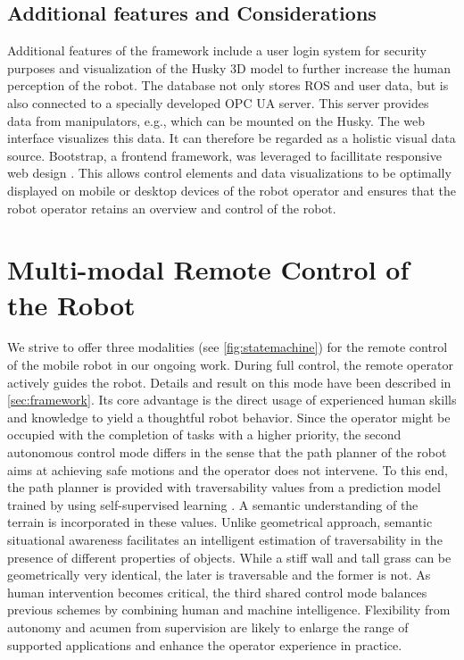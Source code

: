 \documentclass[letterpaper, 10 pt, conference]{ieeeconf}  %
\begin{document}
\subsection{Additional features and Considerations}
Additional features of the framework include a user login system for security purposes and visualization of the Husky 3D model to further increase the human perception of the robot. 
The database not only stores ROS and user data, but is also connected to a specially developed OPC UA server. This server provides data from manipulators, e.g., which can be mounted on the Husky. 
The web interface visualizes this data. It can therefore be regarded as a holistic visual data source.
Bootstrap, a frontend framework, was leveraged to facillitate responsive web design \cite{bootstrap}. 
This allows control elements and data visualizations to be optimally displayed on mobile or desktop devices of the robot operator and ensures that the robot operator retains an overview and control of the robot.




\section{Multi-modal Remote Control of the Robot}
We strive to offer three modalities (see \cref{fig:statemachine}) for the remote control of the mobile robot in our ongoing work. During  full control, the remote operator actively guides the robot. Details and result on this mode have been described in \cref{sec:framework}. Its core advantage is the direct usage of experienced human skills and knowledge to yield a thoughtful robot behavior. Since the operator might be occupied with the completion of  tasks with a higher priority, the second autonomous control mode differs  in the sense that the path planner of the robot aims at achieving safe motions and the operator does not intervene. To this end, the path planner is provided with traversability values from a prediction model trained by using self-supervised learning \cite{wayfaster}. A semantic understanding of the terrain  is incorporated in these values. Unlike geometrical approach, semantic situational awareness facilitates an intelligent estimation of traversability in the presence of  different properties of objects. While a stiff wall and tall grass can be geometrically very identical, the later is traversable and the former is not. As human intervention becomes critical, the third shared control mode balances previous schemes by combining human and machine intelligence. Flexibility from autonomy and acumen from supervision are likely to enlarge the range of supported applications and enhance the operator experience in practice.
\end{document}
